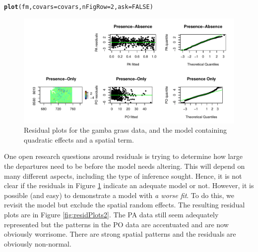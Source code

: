 \documentclass[article,shortnames,nojss]{jss}\usepackage[]{graphicx}\usepackage[]{xcolor}
\makeatletter
\def\maxwidth{ %
  \ifdim\Gin@nat@width>\linewidth
    \linewidth
  \else
    \Gin@nat@width
  \fi
}
\newcommand{\hlnum}[1]{\textcolor[rgb]{0.686,0.059,0.569}{#1}}%
\newcommand{\hlstd}[1]{\textcolor[rgb]{0.345,0.345,0.345}{#1}}%
\newcommand{\hlkwc}[1]{\textcolor[rgb]{0.333,0.667,0.333}{#1}}%
\newcommand{\hlkwd}[1]{\textcolor[rgb]{0.737,0.353,0.396}{\textbf{#1}}}%
\newenvironment{kframe}{%
 \def\at@end@of@kframe{}%
 \ifinner\ifhmode%
  \def\at@end@of@kframe{\end{minipage}}%
  \begin{minipage}{\columnwidth}%
 \fi\fi%
 \def\FrameCommand##1{\hskip\@totalleftmargin \hskip-\fboxsep
 \colorbox{shadecolor}{##1}\hskip-\fboxsep
     \hskip-\linewidth \hskip-\@totalleftmargin \hskip\columnwidth}%
 \MakeFramed {\advance\hsize-\width
   \@totalleftmargin\z@ \linewidth\hsize
   \@setminipage}}%
 {\par\unskip\endMakeFramed%
 \at@end@of@kframe}
\newenvironment{knitrout}{}{} %
\makeatother
\begin{document}
\begin{knitrout}
\color{fgcolor}\begin{kframe}
\begin{alltt}
\hlkwd{plot}\hlstd{( fm,} \hlkwc{covars}\hlstd{=covars,} \hlkwc{nFigRow}\hlstd{=}\hlnum{2}\hlstd{,} \hlkwc{ask}\hlstd{=}\hlnum{FALSE}\hlstd{)}
\end{alltt}
\end{kframe}\begin{figure}

{\centering \includegraphics[width=\maxwidth]{figure/residPlots-1} 

}

\caption[Residual plots for the gamba grass data, and the model containing quadratic effects and a spatial term]{Residual plots for the gamba grass data, and the model containing quadratic effects and a spatial term.}\label{fig:residPlots}
\end{figure}

\end{knitrout}
    
One open research questions around residuals is trying to determine how large the departures need to be before the model needs altering. This will depend on many different aspects, including the type of inference sought. Hence, it is not clear if the residuals in Figure \ref{fig:residPlots} indicate an adequate model or not. However, it is possible (and easy) to demonstrate a model with \textit{a worse fit}. To do this, we revisit the model but exclude the spatial random effects. The resulting residual plots are in Figure \ref{fig:residPlots2}. The PA data still seem adequately represented but the patterns in the PO data are accentuated and are now obviously worrisome. There are strong spatial patterns and the residuals are obviously non-normal.
  
\end{document}
